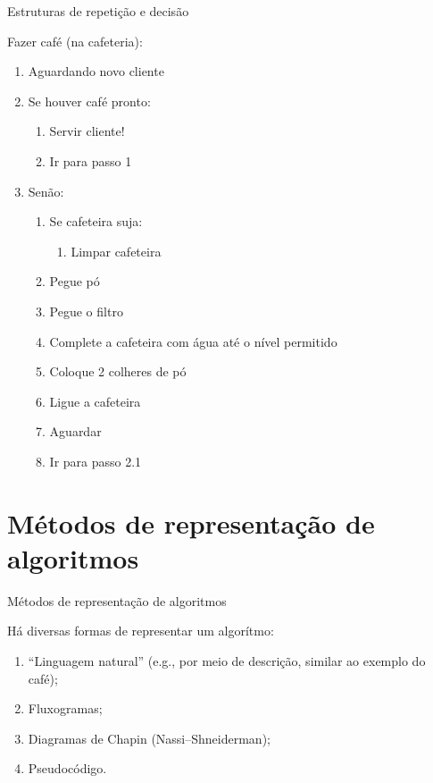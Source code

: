 \documentclass{beamer}
\begin{document}
\begin{frame}{Estruturas de repetição e decisão}
    
    \small

    Fazer café (na cafeteria):

    \begin{enumerate}
        \item Aguardando novo cliente
        \item Se houver café pronto:
        \begin{enumerate}
            \item Servir cliente!
            \item Ir para passo 1
        \end{enumerate}
        \item Senão:
        \begin{enumerate}
            \item Se cafeteira suja:
            \begin{enumerate}
                \item Limpar cafeteira
            \end{enumerate}
            \item Pegue pó
            \item Pegue o filtro
            \item Complete a cafeteira com água até o nível permitido
            \item Coloque 2 colheres de pó
            \item Ligue a cafeteira
            \item Aguardar
            \item Ir para passo 2.1
        \end{enumerate}
    \end{enumerate}
\end{frame}

\section{Métodos de representação de algoritmos}
\begin{frame}{Métodos de representação de algoritmos}
    
    \small

    Há diversas formas de representar um algorítmo:

    \begin{enumerate}
        \item ``Linguagem natural'' (e.g., por meio de descrição, similar ao exemplo do café);
        \item Fluxogramas;
        \item Diagramas de Chapin (Nassi–Shneiderman);
        \item Pseudocódigo.
    \end{enumerate}
\end{frame}
\end{document}
